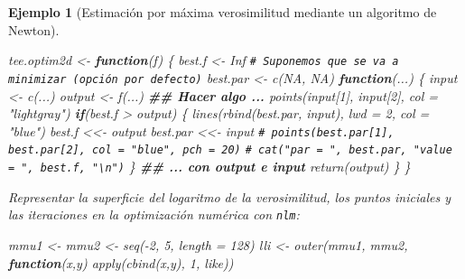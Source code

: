 \documentclass[
]{book}
\newenvironment{Shaded}{\begin{snugshade}}{\end{snugshade}}
\newcommand{\AttributeTok}[1]{\textcolor[rgb]{0.77,0.63,0.00}{#1}}
\newcommand{\CommentTok}[1]{\textcolor[rgb]{0.56,0.35,0.01}{\textit{#1}}}
\newcommand{\ConstantTok}[1]{\textcolor[rgb]{0.00,0.00,0.00}{#1}}
\newcommand{\ControlFlowTok}[1]{\textcolor[rgb]{0.13,0.29,0.53}{\textbf{#1}}}
\newcommand{\DecValTok}[1]{\textcolor[rgb]{0.00,0.00,0.81}{#1}}
\newcommand{\DocumentationTok}[1]{\textcolor[rgb]{0.56,0.35,0.01}{\textbf{\textit{#1}}}}
\newcommand{\FunctionTok}[1]{\textcolor[rgb]{0.00,0.00,0.00}{#1}}
\newcommand{\NormalTok}[1]{#1}
\newcommand{\OtherTok}[1]{\textcolor[rgb]{0.56,0.35,0.01}{#1}}
\newcommand{\SpecialCharTok}[1]{\textcolor[rgb]{0.00,0.00,0.00}{#1}}
\newcommand{\StringTok}[1]{\textcolor[rgb]{0.31,0.60,0.02}{#1}}
\theoremstyle{break}
\newtheorem{example}{Ejemplo}[chapter]
\theoremstyle{nonumberplain}
\renewcommand{\CommentTok}[1]{\textcolor[rgb]{0.41,0.41,0.41}{\texttt{#1}}}
\begin{document}
\begin{example}[Estimación por máxima verosimilitud mediante un algoritmo de Newton]
\begin{Shaded}
\begin{Highlighting}[]
\NormalTok{tee.optim2d }\OtherTok{\textless{}{-}} \ControlFlowTok{function}\NormalTok{(f) \{}
\NormalTok{  best.f }\OtherTok{\textless{}{-}} \ConstantTok{Inf}   \CommentTok{\# Suponemos que se va a minimizar (opción por defecto)}
\NormalTok{  best.par }\OtherTok{\textless{}{-}} \FunctionTok{c}\NormalTok{(}\ConstantTok{NA}\NormalTok{, }\ConstantTok{NA}\NormalTok{)   }
  \ControlFlowTok{function}\NormalTok{(...) \{}
\NormalTok{    input }\OtherTok{\textless{}{-}} \FunctionTok{c}\NormalTok{(...)}
\NormalTok{    output }\OtherTok{\textless{}{-}} \FunctionTok{f}\NormalTok{(...)}
    \DocumentationTok{\#\# Hacer algo ...}
    \FunctionTok{points}\NormalTok{(input[}\DecValTok{1}\NormalTok{], input[}\DecValTok{2}\NormalTok{], }\AttributeTok{col =} \StringTok{"lightgray"}\NormalTok{)}
    \ControlFlowTok{if}\NormalTok{(best.f }\SpecialCharTok{\textgreater{}}\NormalTok{ output) \{}
      \FunctionTok{lines}\NormalTok{(}\FunctionTok{rbind}\NormalTok{(best.par, input), }\AttributeTok{lwd =} \DecValTok{2}\NormalTok{, }\AttributeTok{col =} \StringTok{"blue"}\NormalTok{)}
\NormalTok{      best.f }\OtherTok{\textless{}\textless{}{-}}\NormalTok{ output}
\NormalTok{      best.par }\OtherTok{\textless{}\textless{}{-}}\NormalTok{ input}
      \CommentTok{\# points(best.par[1], best.par[2], col = "blue", pch = 20)}
      \CommentTok{\# cat("par = ", best.par, "value = ", best.f, "\textbackslash{}n")}
\NormalTok{    \} }
    \DocumentationTok{\#\# ... con output e input}
    \FunctionTok{return}\NormalTok{(output)}
\NormalTok{  \}}
\NormalTok{\}}
\end{Highlighting}
\end{Shaded}

Representar la superficie del logaritmo de la verosimilitud,
los puntos iniciales y las iteraciones en la optimización numérica con \texttt{nlm}:

\begin{Shaded}
\begin{Highlighting}[]
\NormalTok{mmu1 }\OtherTok{\textless{}{-}}\NormalTok{ mmu2 }\OtherTok{\textless{}{-}} \FunctionTok{seq}\NormalTok{(}\SpecialCharTok{{-}}\DecValTok{2}\NormalTok{, }\DecValTok{5}\NormalTok{, }\AttributeTok{length =} \DecValTok{128}\NormalTok{)}
\NormalTok{lli }\OtherTok{\textless{}{-}} \FunctionTok{outer}\NormalTok{(mmu1, mmu2, }\ControlFlowTok{function}\NormalTok{(x,y) }\FunctionTok{apply}\NormalTok{(}\FunctionTok{cbind}\NormalTok{(x,y), }\DecValTok{1}\NormalTok{, like))}


\end{Highlighting}
\end{Shaded}
\end{example}
\end{document}
